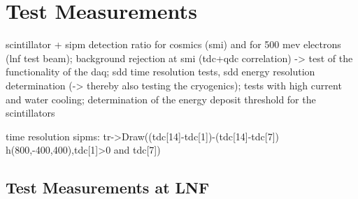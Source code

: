 \chapter{Test Measurements}
\label{chap:TestMeasurements}

scintillator + sipm detection ratio for cosmics (smi) and for 500 mev electrons (lnf test beam); background rejection at smi (tdc+qdc correlation) -> test of the functionality of the daq; sdd time resolution tests, sdd energy resolution determination (-> thereby also testing the cryogenics); tests with high current and water cooling; determination of the energy deposit threshold for the scintillators

time resolution sipms: tr->Draw((tdc[14]-tdc[1])-(tdc[14]-tdc[7]) h(800,-400,400),tdc[1]>0 and tdc[7])

\section{Test Measurements at LNF}
\label{sec:testsLNF}

